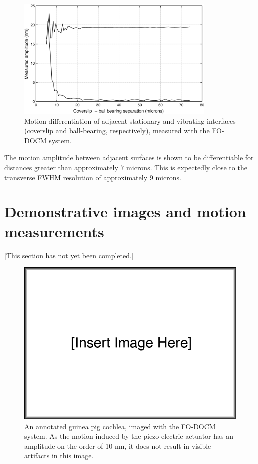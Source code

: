 \begin{figure}[h!]
\centering
\includegraphics[width=0.85\textwidth]{Images/Results/differentiation.png}
\caption[Motion differentiation of adjacent stationary and vibrating interfaces.]{Motion differentiation of adjacent stationary and vibrating interfaces (coverslip and ball-bearing, respectively), measured with the FO-DOCM system.\label{fig:diff}}
\end{figure}

The motion amplitude between adjacent surfaces is shown to be differentiable for distances greater than approximately $7$ microns. This is expectedly close to the transverse FWHM resolution of approximately $9$ microns.

\section{Demonstrative images and motion measurements}

[This section has not yet been completed.]

\begin{figure}[h!]
\centering
\includegraphics[width=1.0\textwidth]{Images/missing.png}
\caption[An annotated guinea pig cochlea, imaged with the FO-DOCM system.]{An annotated guinea pig cochlea, imaged with the FO-DOCM system. As the motion induced by the piezo-electric actuator has an amplitude on the order of 10 nm, it does not result in visible artifacts in this image. \label{fig:cochlea_image}}
\end{figure}


